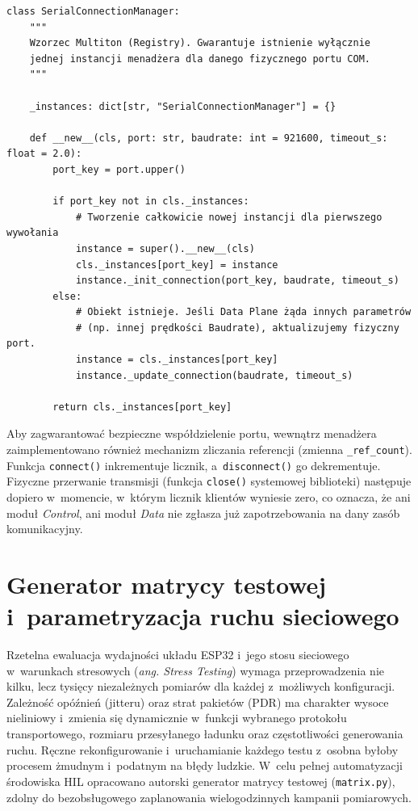 \begin{listing}[htbp]
    \caption{Wykorzystanie wzorca Multiton do zapobiegania kolizjom zasobów sprzętowych przy współdzieleniu fizycznego portu COM (\texttt{connection\_manager.py}) \cite{espy_nexus_python_host}}
    \label{lst:multiton_manager}
    \begin{verbatim}
class SerialConnectionManager:
    """
    Wzorzec Multiton (Registry). Gwarantuje istnienie wyłącznie 
    jednej instancji menadżera dla danego fizycznego portu COM.
    """

    _instances: dict[str, "SerialConnectionManager"] = {}

    def __new__(cls, port: str, baudrate: int = 921600, timeout_s: float = 2.0):
        port_key = port.upper()

        if port_key not in cls._instances:
            # Tworzenie całkowicie nowej instancji dla pierwszego wywołania
            instance = super().__new__(cls)
            cls._instances[port_key] = instance
            instance._init_connection(port_key, baudrate, timeout_s)
        else:
            # Obiekt istnieje. Jeśli Data Plane żąda innych parametrów 
            # (np. innej prędkości Baudrate), aktualizujemy fizyczny port.
            instance = cls._instances[port_key]
            instance._update_connection(baudrate, timeout_s)

        return cls._instances[port_key]
\end{verbatim}
\end{listing}

Aby zagwarantować bezpieczne współdzielenie portu, wewnątrz menadżera zaimplementowano również mechanizm zliczania referencji (zmienna \texttt{\_ref\_count}).
Funkcja \texttt{connect()} inkrementuje licznik, a~\texttt{disconnect()} go dekrementuje.
Fizyczne przerwanie transmisji (funkcja \texttt{close()} systemowej biblioteki) następuje dopiero w~momencie, w~którym licznik klientów wyniesie zero, co oznacza, że ani moduł \textit{Control}, ani moduł \textit{Data} nie zgłasza już zapotrzebowania na dany zasób komunikacyjny.

\section{Generator matrycy testowej i~parametryzacja ruchu sieciowego}
\label{sec:matryca_testowa}

Rzetelna ewaluacja wydajności układu ESP32 i~jego stosu sieciowego w~warunkach stresowych (\textit{ang. Stress Testing}) wymaga przeprowadzenia nie kilku, lecz tysięcy niezależnych pomiarów dla każdej z~możliwych konfiguracji.
Zależność opóźnień (jitteru) oraz strat pakietów (PDR) ma charakter wysoce nieliniowy i~zmienia się dynamicznie w~funkcji wybranego protokołu transportowego, rozmiaru przesyłanego ładunku oraz częstotliwości generowania ruchu.
Ręczne rekonfigurowanie i~uruchamianie każdego testu z~osobna byłoby procesem żmudnym i~podatnym na błędy ludzkie.
W~celu pełnej automatyzacji środowiska HIL opracowano autorski generator matrycy testowej (\texttt{matrix.py}), zdolny do bezobsługowego zaplanowania wielogodzinnych kampanii pomiarowych.

